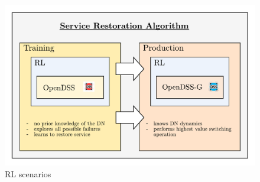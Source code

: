 \begin{figure}
    \centering
    \includegraphics[scale=0.6]{_chapter1/fig/rl_scenarios.pdf}
    \caption{RL scenarios}
    \label{ch1:fig:rl_scenarios}
\end{figure}